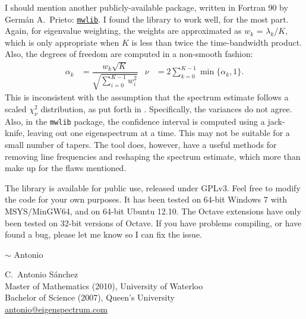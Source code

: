 I should mention another publicly-available package, written in Fortran 90 by 
Germ\'an A.~Prieto: \href{http://wwwprof.uniandes.edu.co/~gprieto/software/%
mwlib.html}{\texttt{mwlib}}.  I found the library to work well, for the most
part.  Again, for eigenvalue weighting, the weights are approximated as 
$w_k$ = $\lambda_k/K$, which is only appropriate when $K$ is less than twice 
the time-bandwidth product.  Also, the degrees of freedom are computed in a 
non-smooth fashion:
\begin{align*}
    \alpha_k & = \dfrac{w_k\sqrt{K}}{\sqrt{\sum_{i=0}^{K-1} w_i^2}} %
        & \nu & = 2\sum_{k=0}^{K-1} \min\{\alpha_k,1\}.
\end{align*}
This is inconsistent with the assumption that the spectrum estimate follows a
scaled $\chi^2_\nu$ distribution, as put forth in \cite{percival:multitaper,%
thomson:multitaper,thomson:lecture}. Specifically, the variances do not agree.
Also, in the \texttt{mwlib} package, the confidence interval is computed using
a jack-knife, leaving out one eigenspectrum at a time.  This may not be 
suitable for a small number of tapers.  The tool does, however, have a useful 
methods for removing line frequencies and reshaping the spectrum estimate, 
which more than make up for the flaws mentioned.

The  library is available for public use, released under GPLv3.  
Feel free to modify the code for your own purposes.  It has been tested on 
64-bit Windows 7 with MSYS/MinGW64, and on 64-bit Ubuntu 12.10.  The Octave
extensions have only been tested on 32-bit versions of Octave.  If you have 
problems compiling, or have found a bug, please let me know so I can fix the 
issue.
\smallskip

\hfill $\sim$ Antonio\hspace*{4ex}
\bigskip

\vfill
\noindent \parbox{\textwidth}{
C.~Antonio S\'anchez\\
Master of Mathematics (2010), University of Waterloo\\
Bachelor of Science (2007), Queen's University\\
\href{mailto:antonio@eigenspectrum.com}{antonio@eigenspectrum.com}
}
\smallskip
